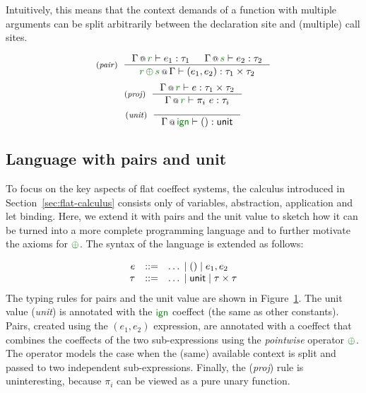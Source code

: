 \noindent
Intuitively, this means that the context demands of a function with multiple arguments can be
split arbitrarily between the declaration site and (multiple) call sites.


\begin{figure}[t]
\begin{equation*}
\tyrule{pair}
  {\coctx{\Gamma}{\cclrd{r}} \vdash e_1 : \tau_1 & \coctx{\Gamma}{\cclrd{s}} \vdash e_2 : \tau_2}
  {\coctx{\cclrd{r}\,\cpar\,\cclrd{s}}{\Gamma} \vdash (e_1, e_2) : \tau_1 \times \tau_2 }
\end{equation*}
\begin{equation*}
\tyrule{proj}
  {\coctx{\Gamma}{\cclrd{r}} \vdash e : \tau_1 \times \tau_2 }
  {\coctx{\Gamma}{\cclrd{r}} \vdash \pi_i~e : \tau_{i} }
\end{equation*}
\begin{equation*}
\tyrule{unit}
  {}
  {\coctx{\Gamma}{\czero} \vdash () : \ident{unit} }
\end{equation*}

\label{fig:flat-ext-types}
\end{figure}


\subsection{Language with pairs and unit}
\label{sec:flat-exts-tup}

To focus on the key aspects of flat coeffect systems, the calculus introduced in Section~\ref{sec:flat-calculus}
consists only of variables, abstraction, application and let binding. Here, we extend it with pairs
and the unit value to sketch how it can be turned into a more complete programming language and to
further motivate the axioms for $\cpar$. The syntax of the language is extended as follows:

\noindent
\begin{equation*}
\begin{array}{rcl}
e &::=& \ldots \sep () \sep e_1, e_2 \\
\tau &::=& \ldots \sep \ident{unit} \sep \tau \times \tau
\end{array}
\end{equation*}
%
The typing rules for pairs and the unit value are shown in Figure~\ref{fig:flat-ext-types}.
The unit value (\emph{unit}) is annotated with the $\czero$ coeffect (the same as other constants).
Pairs, created using the $(e_1, e_2)$ expression, are annotated with a coeffect that combines
the coeffects of the two sub-expressions using the \emph{pointwise} operator $\cpar$. The operator
models the case when the (same) available context is split and passed to two independent
sub-expressions. Finally, the (\emph{proj}) rule is uninteresting, because $\pi_i$ can be
viewed as a pure unary function.

